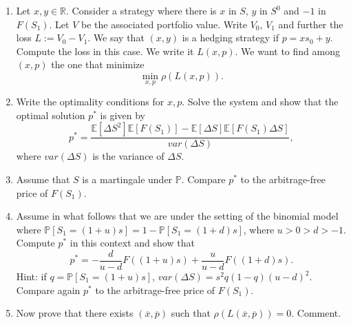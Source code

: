 \documentclass{article}
\begin{document}
\begin{enumerate}
    \item Let $x, y\in\mathbb{R}$. Consider a strategy where there is $x$ in $S$, $y$ in $S^{0}$ and $-1$ in $F(S_{1})$. Let $V$ be the associated portfolio value. Write $V_{0}$, $V_{1}$ and further the loss $L:=V_{0}-V_{1}$. We say that $(x, y)$ is a hedging strategy if $p=xs_{0}+y$. Compute the loss in this case. We write it $L(x,p)$. We want to find among $(x, p)$ the one that minimize
    \[ \min_{x,p}\rho(L(x,p)). \]
    \item Write the optimality conditions for $x, p$. Solve the system and show that the optimal solution $p^{*}$ is given by
    \[ p^{*}=\frac{\mathbb{E}[\Delta S^{2}]\mathbb{E}[F(S_{1})]-\mathbb{E}[\Delta S]\mathbb{E}[F(S_{1})\Delta S]}{var(\Delta S)}, \]
    where $var(\Delta S)$ is the variance of $\Delta S$.
    \item Assume that $S$ is a martingale under $\mathbb{P}$. Compare $p^{*}$ to the arbitrage-free price of $F(S_{1})$.
    \item Assume in what follows that we are under the setting of the binomial model where $\mathbb{P}[S_{1}=(1+u)s]=1-\mathbb{P}[S_{1}=(1+d)s]$, where $u>0>d>-1$. Compute $p^{*}$ in this context and show that
    \[ p^{*}=-\frac{d}{u-d}F((1+u)s)+\frac{u}{u-d}F((1+d)s). \]
    Hint: if $q=\mathbb{P}[S_{1}=(1+u)s]$, $var(\Delta S)=s^{2}q(1-q)(u-d)^{2}$. Compare again $p^{*}$ to the arbitrage-free price of $F(S_{1})$.
    \item Now prove that there exists $(\overline{x},\overline{p})$ such that $\rho(L(\overline{x},\overline{p}))=0$. Comment.
\end{enumerate}
\end{document}
